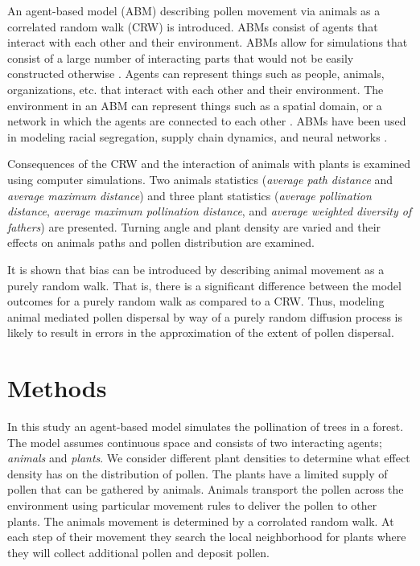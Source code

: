 \documentclass{tran-l}
\theoremstyle{definition}
\theoremstyle{remark}
\numberwithin{equation}{subsection}
\begin{document}
An agent-based model (ABM) describing pollen movement via animals as a
correlated random walk (CRW) is introduced. ABMs consist of agents that interact
with each other and their environment. ABMs allow for simulations that consist
of a large number of interacting parts that would not be easily constructed
otherwise \cite{Fioretti05}. Agents can represent things such as people, animals,
organizations, etc. that interact with each other and their environment. The
environment in an ABM can represent things such as a spatial domain, or a
network in which the agents are connected to each other \cite{Gilbert}. ABMs
have been used in modeling racial segregation, supply chain dynamics, and neural
networks \cite{Gilbert}.

Consequences of the CRW and the interaction of animals with plants is examined
using computer simulations. Two animals statistics (\emph{average path distance}
and \emph{average maximum distance}) and three plant statistics (\emph{average
pollination distance}, \emph{average maximum pollination distance}, and
\emph{average weighted diversity of fathers}) are presented. Turning angle and
plant density are varied and their effects on animals paths and pollen
distribution are examined.

It is shown that bias can be introduced by describing animal movement as a
purely random walk. That is, there is a significant difference between the model
outcomes for a purely random walk as compared to a CRW. Thus, modeling animal
mediated pollen dispersal by way of a purely random diffusion process is likely
to result in errors in the approximation of the extent of pollen dispersal.


\section{{\bf Methods}}
In this study an agent-based model simulates the pollination of trees in a forest. The model assumes continuous space and consists of two interacting agents; \emph{animals} and \emph{plants}.  We consider different plant densities to determine what effect density has on the distribution of pollen.  The plants have a limited supply of pollen that can be gathered by animals.  Animals transport the pollen across the environment using particular movement rules to deliver the pollen to other plants.  The animals movement is determined by a corrolated random walk.  At each step of their movement they search the local neighborhood for plants where they will collect additional pollen and deposit pollen.
\end{document}
